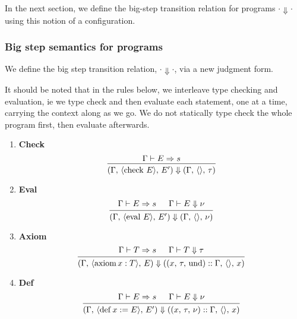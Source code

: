 \documentclass{article}
\begin{document}
In the next section, we define the big-step transition relation for programs $\cdot
\Downarrow \cdot$ using
this notion of a configuration.

\subsubsection{Big step semantics for programs}
We define the big step transition relation, $\cdot \Downarrow \cdot$, via a
new judgment form.

It should be noted that in the rules below, we interleave type checking and 
evaluation, ie we type check and then evaluate each statement, one at a time,
carrying the context along as we go.
We do not statically type check the whole program first, then evaluate
afterwards.

\begin{enumerate}
\item \textbf{Check} \\
  \[
    \begin{prooftree}
      \hypo{\Gamma \vdash E \Rightarrow s}
      \infer1{(\Gamma, \, \langle \checkk \, E \rangle, \, E') \Downarrow
        (\Gamma, \, \langle \rangle, \, \tau)}
    \end{prooftree}
  \]

\item \textbf{Eval} \\
  \[
    \begin{prooftree}
      \hypo{\Gamma \vdash E \Rightarrow s}
      \hypo{\Gamma \vdash E \Downarrow \nu}
      \infer2{(\Gamma, \, \langle \evall \, E \rangle, \, E') \Downarrow
        (\Gamma, \, \langle \rangle, \, \nu)}
    \end{prooftree}
  \]

\item \textbf{Axiom} \\
  \[
    \begin{prooftree}
      \hypo{\Gamma \vdash T \Rightarrow s}
      \hypo{\Gamma \vdash T \Downarrow \tau}
      \infer2{(\Gamma, \, \langle \axiom x : T \rangle, \, E) \Downarrow
        ((x, \, \tau, \, \text{und}) :: \Gamma, \, \langle \rangle, \, x)}
    \end{prooftree}
  \]

\item \textbf{Def} \\
  \[
    \begin{prooftree}
      \hypo{\Gamma \vdash E \Rightarrow s}
      \hypo{\Gamma \vdash E \Downarrow \nu}
      \infer2{(\Gamma, \, \langle \deff x := E \rangle, \, E') \Downarrow
        ((x, \, \tau, \, \nu) :: \Gamma, \, \langle \rangle, \, x)}
    \end{prooftree}
  \]


\end{enumerate}
\end{document}
